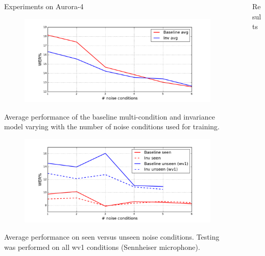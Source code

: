 \documentclass[final]{beamer}
\newlength{\sepwid}
\newlength{\onecolwid}
\newlength{\twocolwid}
\begin{document}
\begin{frame}[t]
\begin{columns}[t]
\begin{column}{\twocolwid}
\begin{columns}[t]
\begin{column}{\onecolwid}
\begin{block}{{\Large Experiments on Aurora-4}}
                \vspace{1cm}
                \begin{figure}
                    \centering
                    \includegraphics[width=\linewidth]{wer_avg.pdf}
                \end{figure}
                Average performance of the baseline multi-condition and invariance model varying with the 
                number of noise conditions used for training. 
                \vspace{4cm}
                \begin{figure}
                    \centering
                    \includegraphics[width=\linewidth]{wer_seen_unseen.pdf}
                \end{figure}
                Average performance on seen versus 
                unseen noise conditions.
                Testing was performed on all wv1 conditions (Sennheiser microphone).
            \end{block}
        \end{column} %
    \end{columns}
\end{column}

\begin{column}{\sepwid}\end{column} %
\begin{column}{\onecolwid} %
\begin{block}{Results}


\end{block}
\end{column}
\end{columns}
\end{frame}
\end{document}
